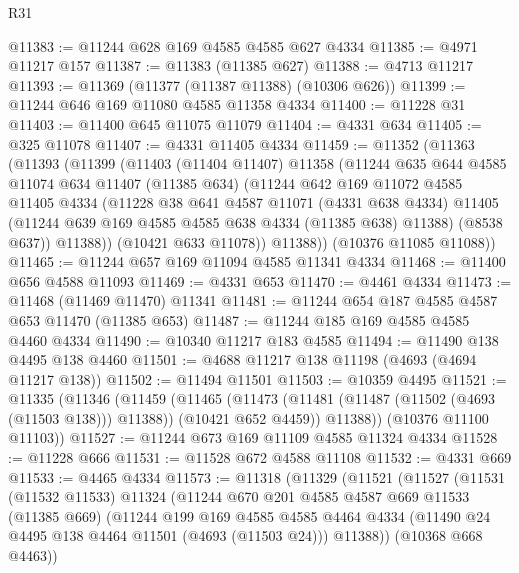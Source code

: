 \begin{lexlean}{R31}
\begin{coremodule}
@11383 := @11244 @628 @169 @4585 @4585 @627 @4334
@11385 := @4971 @11217 @157
@11387 := @11383 (@11385 @627)
@11388 := @4713 @11217
@11393 := @11369 (@11377 (@11387 @11388) (@10306 @626))
@11399 := @11244 @646 @169 @11080 @4585 @11358 @4334
@11400 := @11228 @31
@11403 := @11400 @645 @11075 @11079
@11404 := @4331 @634
@11405 := @325 @11078
@11407 := @4331 @11405 @4334
@11459 := @11352
    (@11363
      (@11393
        (@11399
          (@11403
            (@11404 @11407)
            @11358
            (@11244
              @635
              @644
              @4585
              @11074
              @634
              @11407
              (@11385 @634)
              (@11244
                @642
                @169
                @11072
                @4585
                @11405
                @4334
                (@11228
                  @38
                  @641
                  @4587
                  @11071
                  (@4331 @638 @4334)
                  @11405
                  (@11244 @639 @169 @4585 @4585 @638 @4334 (@11385 @638) @11388)
                  (@8538 @637))
                @11388))
            (@10421 @633 @11078))
          @11388))
      (@10376 @11085 @11088))
@11465 := @11244 @657 @169 @11094 @4585 @11341 @4334
@11468 := @11400 @656 @4588 @11093
@11469 := @4331 @653
@11470 := @4461 @4334
@11473 := @11468 (@11469 @11470) @11341
@11481 := @11244 @654 @187 @4585 @4587 @653 @11470 (@11385 @653)
@11487 := @11244 @185 @169 @4585 @4585 @4460 @4334
@11490 := @10340 @11217 @183 @4585
@11494 := @11490 @138 @4495 @138 @4460
@11501 := @4688 @11217 @138 @11198 (@4693 (@4694 @11217 @138))
@11502 := @11494 @11501
@11503 := @10359 @4495
@11521 := @11335
    (@11346
      (@11459
        (@11465
          (@11473 (@11481 (@11487 (@11502 (@4693 (@11503 @138))) @11388)) (@10421 @652 @4459))
          @11388))
      (@10376 @11100 @11103))
@11527 := @11244 @673 @169 @11109 @4585 @11324 @4334
@11528 := @11228 @666
@11531 := @11528 @672 @4588 @11108
@11532 := @4331 @669
@11533 := @4465 @4334
@11573 := @11318
    (@11329
      (@11521
        (@11527
          (@11531
            (@11532 @11533)
            @11324
            (@11244
              @670
              @201
              @4585
              @4587
              @669
              @11533
              (@11385 @669)
              (@11244
                @199
                @169
                @4585
                @4585
                @4464
                @4334
                (@11490 @24 @4495 @138 @4464 @11501 (@4693 (@11503 @24)))
                @11388))
            (@10368 @668 @4463))

\end{coremodule}
\end{lexlean}
